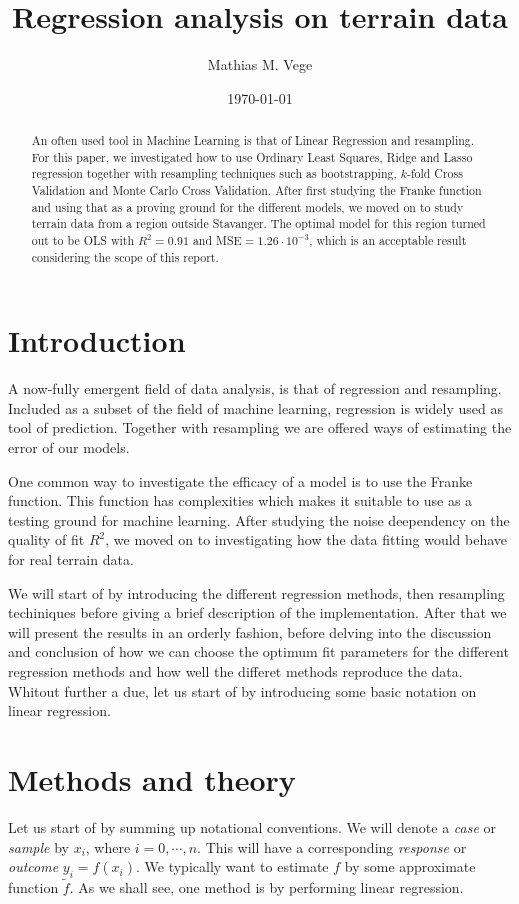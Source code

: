 \documentclass[11pt]{article}
\title{Regression analysis on terrain data}
\author{Mathias M. Vege}
\date{\today}
\begin{document}
\maketitle

\begin{abstract}
An often used tool in Machine Learning is that of Linear Regression and resampling. For this paper, we investigated how to use Ordinary Least Squares, Ridge and Lasso regression together with resampling techniques such as bootstrapping, $k$-fold Cross Validation and Monte Carlo Cross Validation. After first studying the Franke function and using that as a proving ground for the different models, we moved on to study terrain data from a region outside Stavanger. The optimal model for this region turned out to be OLS with $R^2=0.91$ and MSE$=1.26\cdot 10^{-3}$, which is an acceptable result considering the scope of this report.
\end{abstract}

\tableofcontents

\section{Introduction}
A now-fully emergent field of data analysis, is that of regression and resampling. Included as a subset of the field of machine learning, regression is widely used as tool of prediction. Together with resampling we are offered ways of estimating the error of our models.

One common way to investigate the efficacy of a model is to use the Franke function\cite{franke1979critical}. This function has complexities which makes it suitable to use as a testing ground for machine learning. After studying the noise deependency on the quality of fit $R^2$, we moved on to investigating how the data fitting would behave for real terrain data.

We will start of by introducing the different regression methods, then resampling techiniques before giving a brief description of the implementation. After that we will present the results in an orderly fashion, before delving into the discussion and conclusion of how we can choose the optimum fit parameters for the different regression methods and how well the differet methods reproduce the data. Whitout further a due, let us start of by introducing some basic notation on linear regression.

\section{Methods and theory}
Let us start of by summing up notational conventions. We will denote a \textit{case} or \textit{sample} by $x_i$, where $i=0,\cdots,n$. This will have a corresponding \textit{response} or \textit{outcome} $y_i = f(x_i)$. We typically want to estimate $f$ by some approximate function $\tilde{f}$. As we shall see, one method is by performing linear regression.
\end{document}
